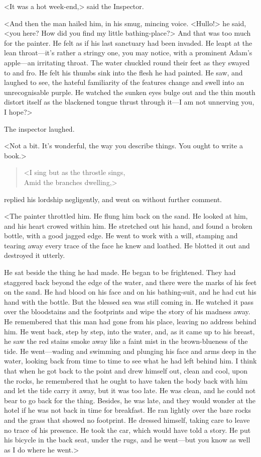 <It was a hot week-end,> said the Inspector.

<And then the man hailed him, in his smug, mincing voice. <Hullo!> he said, <you here? How did you find my little bathing-place?> And that was too much for the painter. He felt as if his last sanctuary had been invaded. He leapt at the lean throat—it's rather a stringy one, you may notice, with a prominent Adam's apple—an irritating throat. The water chuckled round their feet as they swayed to and fro. He felt his thumbs sink into the flesh he had painted. He saw, and laughed to see, the hateful familiarity of the features change and swell into an unrecognisable purple. He watched the sunken eyes bulge out and the thin mouth distort itself as the blackened tongue thrust through it—I am not unnerving you, I hope?>

The inspector laughed.

<Not a bit. It's wonderful, the way you describe things. You ought to write a book.>

\begin{quote}
<I sing but as the throstle sings,\\
Amid the branches dwelling,>
\end{quote}
\indent replied his lordship negligently, and went on without further comment.

<The painter throttled him. He flung him back on the sand. He looked at him, and his heart crowed within him. He stretched out his hand, and found a broken bottle, with a good jagged edge. He went to work with a will, stamping and tearing away every trace of the face he knew and loathed. He blotted it out and destroyed it utterly.

He sat beside the thing he had made. He began to be frightened. They had staggered back beyond the edge of the water, and there were the marks of his feet on the sand. He had blood on his face and on his bathing-suit, and he had cut his hand with the bottle. But the blessed sea was still coming in. He watched it pass over the bloodstains and the footprints and wipe the story of his madness away. He remembered that this man had gone from his place, leaving no address behind him. He went back, step by step, into the water, and, as it came up to his breast, he saw the red stains smoke away like a faint mist in the brown-blueness of the tide. He went—wading and swimming and plunging his face and arms deep in the water, looking back from time to time to see what he had left behind him. I think that when he got back to the point and drew himself out, clean and cool, upon the rocks, he remembered that he ought to have taken the body back with him and let the tide carry it away, but it was too late. He was clean, and he could not bear to go back for the thing. Besides, he was late, and they would wonder at the hotel if he was not back in time for breakfast. He ran lightly over the bare rocks and the grass that showed no footprint. He dressed himself, taking care to leave no trace of his presence. He took the car, which would have told a story. He put his bicycle in the back seat, under the rugs, and he went—but you know as well as I do where he went.>

